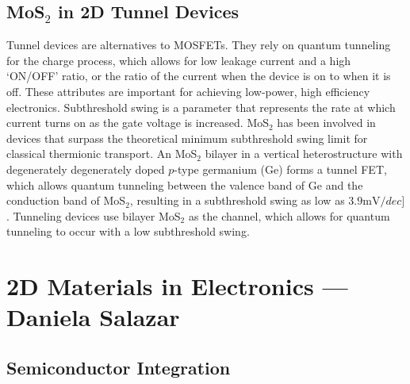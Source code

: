 \documentclass[conference]{IEEEtran}
\begin{document}
\subsection{MoS$_2$ in 2D Tunnel Devices}

Tunnel devices are alternatives to MOSFETs. They rely on quantum tunneling for the charge process, which allows for low leakage current and a high `\textsc{ON/OFF}' ratio, or the ratio of the current when the device is on to when it is off. These attributes are important for achieving low-power, high efficiency electronics. Subthreshold swing is a parameter that represents the rate at which current turns on as the gate voltage is increased. MoS$_2$ has been involved in devices that surpass the theoretical minimum subthreshold swing limit for classical thermionic transport. An MoS$_2$ bilayer in a vertical heterostructure with degenerately degenerately doped $p$-type germanium (Ge) forms a tunnel FET, which allows quantum tunneling between the valence band of Ge and the conduction band of MoS$_2$, resulting in a subthreshold swing as low as $3.9\si{\milli\volt\per dec}]$ \cite{oa11}. Tunneling devices use bilayer MoS$_2$ as the channel, which allows for quantum tunneling to occur with a low subthreshold swing. 

\section{2D Materials in Electronics — Daniela Salazar}

\subsection{Semiconductor Integration}
\end{document}
